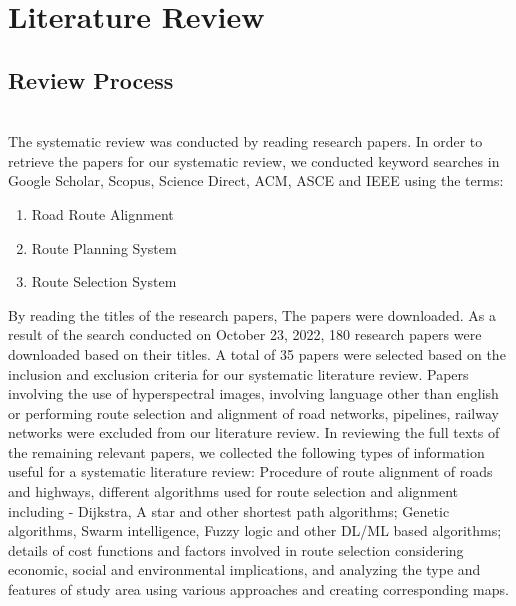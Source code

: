 %

\hypersetup{
    linkcolor=blue,
}
{\let\clearpage\relax \chapter{Literature Review}}
\section{Review Process}\\The systematic review was conducted by reading research papers. In order to retrieve the papers for our systematic review, we conducted keyword searches in Google Scholar, Scopus, Science Direct, ACM, ASCE and IEEE using the terms: 
\begin{enumerate}
    \item Road Route Alignment
    \item Route Planning System
    \item Route Selection System
\end{enumerate} By reading the titles of the research papers, The papers were downloaded. As a result of the search conducted on October 23, 2022, 180 research papers were downloaded based on their titles. A total of 35 papers were selected based on the inclusion and exclusion criteria for our systematic literature review. Papers involving the use of hyperspectral images, involving language other than english or performing route selection and alignment of road networks, pipelines, railway networks were excluded from our literature review. In reviewing the full texts of the remaining relevant papers, we collected the following types of information useful for a systematic literature review: Procedure of route alignment of roads and highways, different algorithms used for route selection and alignment including - Dijkstra, A star and other shortest path algorithms; Genetic algorithms, Swarm intelligence, Fuzzy logic and other DL/ML based algorithms; details of cost functions and factors involved in route selection considering economic, social and environmental implications, and analyzing the type and features of study area using various approaches and creating corresponding maps.
